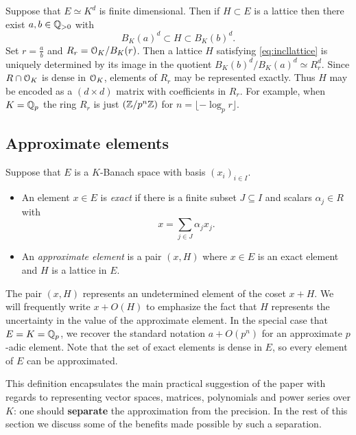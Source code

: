 \documentclass{lms}
\begin{document}
Suppose that $E \simeq K^d$ is finite dimensional.  Then if $H \subset E$
is a lattice then there exist $a, b \in \mathbb Q_{>0}$ with
\begin{equation}
\label{eq:incllattice}
B_K(a)^d \subset H \subset B_K(b)^d.
\end{equation}
Set $r = \frac a b$ and $R_r = \OK/B_K(r)$.  
Then a lattice $H$ satisfying \eqref{eq:incllattice} is uniquely 
determined by its image in the quotient $B_K(b)^d / B_K(a)^d \simeq 
R_r^d$.  Since $R \cap \OK$ is dense in $\OK$, elements of $R_r$ may be
represented exactly.  Thus $H$ may be encoded as a 
$(d \times d)$ matrix with coefficients in $R_r$.  For example, when
$K = \mathbb Q_p$ the ring $R_r$ is just $(\mathbb Z / p^n\mathbb Z)$ for $n = \lfloor - \log_p r \rfloor$.

\subsection{Approximate elements}

Suppose that $E$ is a $K$-Banach space with basis $(x_i)_{i \in I}$.
\begin{deftn}
\begin{itemize}
\item An element $x \in E$ is \emph{exact} if there is a finite subset $J \subseteq I$ and scalars $\alpha_j \in R$ with
\begin{equation} \label{eq:exact_elt}
x = \sum_{j \in J} \alpha_j x_j.
\end{equation}

\item An \emph{approximate element} is a pair $(x, H)$ where $x \in E$ is an exact element
and $H$ is a lattice in $E$.
\end{itemize}
\end{deftn}

The pair $(x, H)$ represents an undetermined element of the coset
$x + H$.  We will frequently write $x + O(H)$ to emphasize the fact that $H$ represents
the uncertainty in the value of the approximate element.  In the special case that $E = K = \mathbb Q_p$,
we recover the standard notation $a + O(p^n)$ for an approximate $p$-adic element.
Note that the set of exact elements is dense in $E$, so every element of $E$ can be approximated.

This definition encapsulates the main practical suggestion of the paper with regards to representing
vector spaces, matrices, polynomials and power series over $K$: one should \textbf{separate} the
approximation from the precision.  In the rest of this section we discuss some of the benefits made
possible by such a separation.
\end{document}
